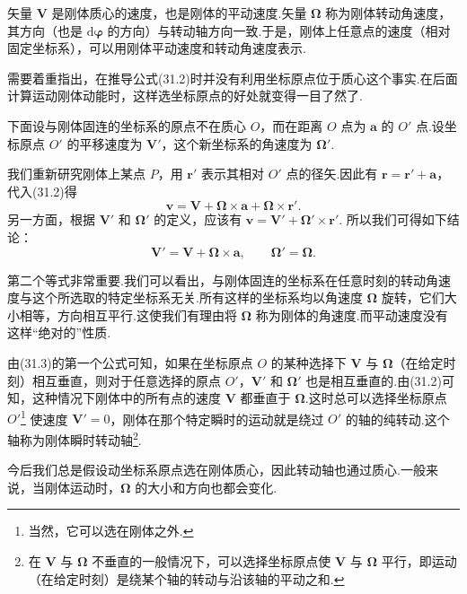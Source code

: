 矢量 $\boldsymbol{V}$ 是刚体质心的速度，也是刚体的平动速度.矢量 $\boldsymbol{\Omega}$ 称为刚体转动角速度，其方向（也是 $\mathrm{d}\boldsymbol{\varphi}$ 的方向）与转动轴方向一致.于是，刚体上任意点的速度（相对固定坐标系），可以用刚体平动速度和转动角速度表示.

需要着重指出，在推导公式(31.2)时并没有利用坐标原点位于质心这个事实.在后面计算运动刚体动能时，这样选坐标原点的好处就变得一目了然了.

下面设与刚体固连的坐标系的原点不在质心 $O$，而在距离 $O$ 点为 $\boldsymbol{a}$ 的 $O'$ 点.设坐标原点 $O'$ 的平移速度为 $\boldsymbol{V}'$，这个新坐标系的角速度为 $\boldsymbol{\Omega}'$.

我们重新研究刚体上某点 $P$，用 $\boldsymbol{r}'$ 表示其相对 $O'$ 点的径矢.因此有 $\boldsymbol{r}=\boldsymbol{r}'+\boldsymbol{a}$，代入(31.2)得
\begin{equation*}
  \boldsymbol{v}=\boldsymbol{V}+\boldsymbol{\Omega}\times\boldsymbol{a}
  +\boldsymbol{\Omega}\times\boldsymbol{r}'.
\end{equation*}
另一方面，根据 $\boldsymbol{V}'$ 和 $\boldsymbol{\Omega}'$ 的定义，应该有
$\boldsymbol{v}=\boldsymbol{V}'+\boldsymbol{\Omega}'\times\boldsymbol{r}'$.
所以我们可得如下结论：
\begin{equation}
  \boldsymbol{V}'=\boldsymbol{V}+\boldsymbol{\Omega}\times\boldsymbol{a},
  \qquad \boldsymbol{\Omega}'=\boldsymbol{\Omega}.
\end{equation}

第二个等式非常重要.我们可以看出，与刚体固连的坐标系在任意时刻的转动角速度与这个所选取的特定坐标系无关.所有这样的坐标系均以角速度 $\boldsymbol{\Omega}$ 旋转，它们大小相等，方向相互平行.这使我们有理由将 $\boldsymbol{\Omega}$ 称为刚体的角速度.而平动速度没有这样“绝对的”性质.

由(31.3)的第一个公式可知，如果在坐标原点 $O$ 的某种选择下 $\boldsymbol{V}$ 与 $\boldsymbol{\Omega}$（在给定时刻）相互垂直，则对于任意选择的原点 $O'$，$\boldsymbol{V}'$ 和 $\boldsymbol{\Omega}'$ 也是相互垂直的.由(31.2)可知，这种情况下刚体中的所有点的速度 $\boldsymbol{V}$ 都垂直于 $\boldsymbol{\Omega}$.这时总可以选择坐标原点 $O'$\footnote{当然，它可以选在刚体之外.} 使速度 $\boldsymbol{V}'=0$，刚体在那个特定瞬时的运动就是绕过 $O'$ 的轴的纯转动.这个轴称为刚体瞬时转动轴\footnote{在 $\boldsymbol{V}$ 与 $\boldsymbol{\Omega}$ 不垂直的一般情况下，可以选择坐标原点使 $\boldsymbol{V}$ 与 $\boldsymbol{\Omega}$ 平行，即运动（在给定时刻）是绕某个轴的转动与沿该轴的平动之和.}.

今后我们总是假设动坐标系原点选在刚体质心，因此转动轴也通过质心.一般来说，当刚体运动时，$\boldsymbol{\Omega}$ 的大小和方向也都会变化.

